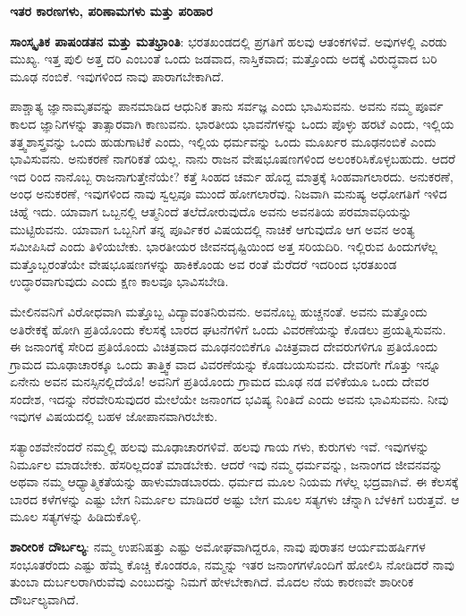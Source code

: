 \begin{center}
\textbf{ಇತರ ಕಾರಣಗಳು, ಪರಿಣಾಮಗಳು ಮತ್ತು ಪರಿಹಾರ}
\end{center}

\textbf{ಸಾಂಸ್ಕೃತಿಕ ಪಾಷಂಡತನ ಮತ್ತು ಮತಭ್ರಾಂತಿ}: ಭರತಖಂಡದಲ್ಲಿ ಪ್ರಗತಿಗೆ ಹಲವು ಆತಂಕಗಳಿವೆ. ಅವುಗಳಲ್ಲಿ ಎರಡು ಮುಖ್ಯ. ಇತ್ತ ಪುಲಿ ಅತ್ತ ದರಿ ಎಂಬಂತೆ ಒಂದು ಜಡವಾದ, ನಾಸ್ತಿಕವಾದ; ಮತ್ತೊಂದು ಅದಕ್ಕೆ ವಿರುದ್ಧವಾದ ಬರಿ ಮೂಢ ನಂಬಿಕೆ. ಇವುಗಳಿಂದ ನಾವು ಪಾರಾಗಬೇಕಾಗಿದೆ.

ಪಾಶ್ಚಾತ್ಯ ಜ್ಞಾನಾಮೃತವನ್ನು ಪಾನಮಾಡಿದ ಆಧುನಿಕ ತಾನು ಸರ್ವಜ್ಞ ಎಂದು ಭಾವಿಸುವನು. ಅವನು ನಮ್ಮ ಪೂರ್ವ ಕಾಲದ ಜ್ಞಾನಿಗಳನ್ನು ತಾತ್ಸಾರವಾಗಿ ಕಾಣುವನು. ಭಾರತೀಯ ಭಾವನೆಗಳನ್ನು ಒಂದು ಪೊಳ್ಳು ಹರಟೆ ಎಂದು, ಇಲ್ಲಿಯ ತತ್ತ್ವಶಾಸ್ತ್ರವನ್ನು ಒಂದು ಹುಡುಗಾಟಿಕೆ ಎಂದು, ಇಲ್ಲಿಯ ಧರ್ಮವನ್ನು ಒಂದು ಮೂರ್ಖರ ಮೂಢನಂಬಿಕೆ ಎಂದು ಭಾವಿಸುವನು. ಅನುಕರಣೆ ನಾಗರಿಕತೆ ಯಲ್ಲ. ನಾನು ರಾಜನ ವೇಷಭೂಷಣಗಳಿಂದ ಅಲಂಕರಿಸಿಕೊಳ್ಳಬಹುದು. ಆದರೆ ಇದ ರಿಂದ ನಾನೊಬ್ಬ ರಾಜನಾಗುತ್ತೇನೆಯೇ? ಕತ್ತೆ ಸಿಂಹದ ಚರ್ಮ ಹೊದ್ದ ಮಾತ್ರಕ್ಕೆ ಸಿಂಹವಾಗಲಾರದು. ಅನುಕರಣೆ, ಅಂಧ ಅನುಕರಣೆ, ಇವುಗಳಿಂದ ನಾವು ಸ್ವಲ್ಪವೂ ಮುಂದೆ ಹೋಗಲಾರೆವು. ನಿಜವಾಗಿ ಮನುಷ್ಯ ಅಧೋಗತಿಗೆ ಇಳಿದ ಚಿಹ್ನೆ ಇದು. ಯಾವಾಗ ಒಬ್ಬನಲ್ಲಿ ಆತ್ಮನಿಂದೆ ತಲೆದೋರುವುದೊ ಅವನು ಅವನತಿಯ ಪರಮಾವಧಿಯನ್ನು ಮುಟ್ಟಿರುವನು. ಯಾವಾಗ ಒಬ್ಬನಿಗೆ ತನ್ನ ಪೂರ್ವಿಕರ ವಿಷಯದಲ್ಲಿ ನಾಚಿಕೆ ಆಗುವುದೊ ಆಗ ಅವನ ಅಂತ್ಯ ಸಮೀಪಿಸಿದೆ ಎಂದು ತಿಳಿಯಬೇಕು. ಭಾರತೀಯರ ಜೀವನದೃಷ್ಟಿಯಿಂದ ಅತ್ತ ಸರಿಯದಿರಿ. ಇಲ್ಲಿರುವ ಹಿಂದುಗಳೆಲ್ಲ ಮತ್ತೊಬ್ಬರಂತೆಯೇ ವೇಷಭೂಷಣಗಳನ್ನು ಹಾಕಿಕೊಂಡು ಅವ ರಂತೆ ಮೆರೆದರೆ ಇದರಿಂದ ಭರತಖಂಡ ಉದ್ಧಾರವಾಗುವುದು ಎಂದು ಕ್ಷಣ ಕಾಲವೂ ಭಾವಿಸಬೇಡಿ.

ಮೇಲಿನವನಿಗೆ ವಿರೋಧವಾಗಿ ಮತ್ತೊಬ್ಬ ವಿದ್ಯಾವಂತನಿರುವನು. ಅವನೊಬ್ಬ ಹುಚ್ಚನಂತೆ. ಅವನು ಮತ್ತೊಂದು ಅತಿರೇಕಕ್ಕೆ ಹೋಗಿ ಪ್ರತಿಯೊಂದು ಕೆಲಸಕ್ಕೆ ಬಾರದ ಘಟನೆಗಳಿಗೆ ಒಂದು ವಿವರಣೆಯನ್ನು ಕೊಡಲು ಪ್ರಯತ್ನಿಸುವನು. ಈ ಜನಾಂಗಕ್ಕೆ ಸೇರಿದ ಪ್ರತಿಯೊಂದು ವಿಚಿತ್ರವಾದ ಮೂಢನಂಬಿಕೆಗೂ ವಿಚಿತ್ರವಾದ ದೇವರುಗಳಿಗೂ ಪ್ರತಿಯೊಂದು ಗ್ರಾಮದ ಮೂಢಾಚಾರಕ್ಕೂ ಒಂದು ತಾತ್ತ್ವಿಕ ವಾದ ವಿವರಣೆಯನ್ನು ಕೊಡಬಯಸುವನು. ದೇವರಿಗೇ ಗೊತ್ತು ಇನ್ನೂ ಏನೇನು ಅವನ ಮನಸ್ಸಿನಲ್ಲಿದೆಯೊ! ಅವನಿಗೆ ಪ್ರತಿಯೊಂದು ಗ್ರಾಮದ ಮೂಢ ನಡ ವಳಿಕೆಯೂ ಒಂದು ದೇವರ ಸಂದೇಶ, ಇದನ್ನು ನೆರವೇರಿಸುವುದರ ಮೇಲೆಯೇ ಜನಾಂಗದ ಭವಿಷ್ಯ ನಿಂತಿದೆ ಎಂದು ಅವನು ಭಾವಿಸುವನು. ನೀವು ಇವುಗಳ ವಿಷಯದಲ್ಲಿ ಬಹಳ ಜೋಪಾನವಾಗಿರಬೇಕು.

ಸತ್ಯಾಂಶವೇನೆಂದರೆ ನಮ್ಮಲ್ಲಿ ಹಲವು ಮೂಢಾಚಾರಗಳಿವೆ. ಹಲವು ಗಾಯ ಗಳು, ಕುರುಗಳು ಇವೆ. ಇವುಗಳನ್ನು ನಿರ್ಮೂಲ ಮಾಡಬೇಕು. ಹೆಸರಿಲ್ಲದಂತೆ ಮಾಡಬೇಕು. ಆದರೆ ಇವು ನಮ್ಮ ಧರ್ಮವನ್ನು, ಜನಾಂಗದ ಜೀವನವನ್ನು ಅಥವಾ ನಮ್ಮ ಆಧ್ಯಾತ್ಮಿಕತೆಯನ್ನು ಹಾಳುಮಾಡಬಾರದು. ಧರ್ಮದ ಮೂಲ ನಿಯಮ ಗಳೆಲ್ಲ ಭದ್ರವಾಗಿವೆ. ಈ ಕೆಲಸಕ್ಕೆ ಬಾರದ ಕಳೆಗಳನ್ನು ಎಷ್ಟು ಬೇಗ ನಿರ್ಮೂಲ ಮಾಡಿದರೆ ಅಷ್ಟು ಬೇಗ ಮೂಲ ಸತ್ಯಗಳು ಚೆನ್ನಾಗಿ ಬೆಳಕಿಗೆ ಬರುತ್ತವೆ. ಆ ಮೂಲ ಸತ್ಯಗಳನ್ನು ಹಿಡಿದುಕೊಳ್ಳಿ.

\textbf{ಶಾರೀರಿಕ ದೌರ್ಬಲ್ಯ}: ನಮ್ಮ ಉಪನಿಷತ್ತು ಎಷ್ಟು ಅಮೋಘವಾಗಿದ್ದರೂ, ನಾವು ಪುರಾತನ ಆರ್ಯಮಹರ್ಷಿಗಳ ಸಂಭೂತರೆಂದು ಎಷ್ಟು ಹೆಮ್ಮೆ ಕೊಚ್ಚಿ ಕೊಂಡರೂ, ನಮ್ಮನ್ನು ಇತರ ಜನಾಂಗಗಳೊಂದಿಗೆ ಹೋಲಿಸಿ ನೋಡಿದರೆ ನಾವು ತುಂಬಾ ದುರ್ಬಲರಾಗಿರುವೆವು ಎಂಬುದನ್ನು ನಿಮಗೆ ಹೇಳಬೇಕಾಗಿದೆ. ಮೊದಲ ನೆಯ ಕಾರಣವೇ ಶಾರೀರಿಕ ದೌರ್ಬಲ್ಯವಾಗಿದೆ.

